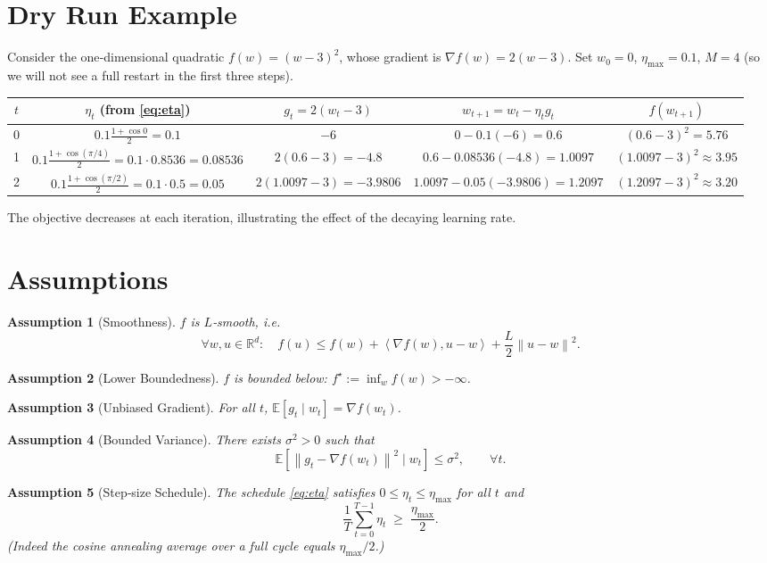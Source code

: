 \documentclass{article}
\newtheorem{assumption}{Assumption}
\newcommand{\EE}{\mathbb{E}}
\newcommand{\RR}{\mathbb{R}}
\newcommand{\norm}[1]{\left\|#1\right\|}
\newcommand{\inner}[2]{\left\langle #1,#2\right\rangle}
\begin{document}
\section*{Dry Run Example}
Consider the one‑dimensional quadratic $f(w)=(w-3)^2$, whose gradient is $\nabla f(w)=2(w-3)$.  
Set $w_0=0$, $\eta_{\max}=0.1$, $M=4$ (so we will not see a full restart in the first three steps).

\begin{center}
\begin{tabular}{c|c|c|c|c}
$t$ & $\eta_t$ (from \eqref{eq:eta}) & $g_t=2(w_t-3)$ & $w_{t+1}=w_t-\eta_t g_t$ & $f(w_{t+1})$ \\ \hline
0 & $0.1\frac{1+\cos0}{2}=0.1$ & $-6$ & $0-0.1(-6)=0.6$ & $(0.6-3)^2=5.76$\\
1 & $0.1\frac{1+\cos(\pi/4)}{2}=0.1\cdot0.8536=0.08536$ & $2(0.6-3)=-4.8$ & $0.6-0.08536(-4.8)=1.0097$ & $(1.0097-3)^2\approx3.95$\\
2 & $0.1\frac{1+\cos(\pi/2)}{2}=0.1\cdot0.5=0.05$ & $2(1.0097-3)=-3.9806$ & $1.0097-0.05(-3.9806)=1.2097$ & $(1.2097-3)^2\approx3.20$\\
\end{tabular}
\end{center}
The objective decreases at each iteration, illustrating the effect of the decaying learning rate.

\newpage
\section*{Assumptions}
\begin{assumption}[Smoothness]\label{ass:smooth}
$f$ is $L$‑smooth, i.e.
\[
\forall w,u\in\RR^{d}:\quad 
f(u)\le f(w)+\inner{\nabla f(w)}{u-w}+\frac{L}{2}\norm{u-w}^{2}.
\]
\end{assumption}
\begin{assumption}[Lower Boundedness]\label{ass:lb}
$f$ is bounded below: $f^{\star}:=\inf_{w}f(w)>-\infty$.
\end{assumption}
\begin{assumption}[Unbiased Gradient]\label{ass:unbiased}
For all $t$, $\EE\!\left[g_t\mid w_t\right]=\nabla f(w_t)$.
\end{assumption}
\begin{assumption}[Bounded Variance]\label{ass:variance}
There exists $\sigma^{2}>0$ such that
\[
\EE\!\left[\norm{g_t-\nabla f(w_t)}^{2}\mid w_t\right]\le\sigma^{2},\qquad\forall t.
\]
\end{assumption}
\begin{assumption}[Step‑size Schedule]\label{ass:eta}
The schedule \eqref{eq:eta} satisfies $0\le\eta_t\le\eta_{\max}$ for all $t$ and
\[
\frac{1}{T}\sum_{t=0}^{T-1}\eta_t \;\ge\; \frac{\eta_{\max}}{2}.
\]
(Indeed the cosine annealing average over a full cycle equals $\eta_{\max}/2$.)
\end{assumption}
\end{document}
